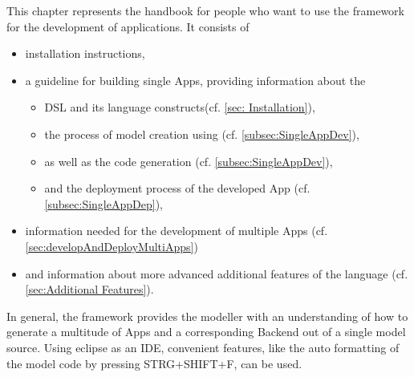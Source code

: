 

This chapter represents the handbook for people who want to use the \MD framework for the development of applications. It consists of

\begin{itemize}
	\item installation instructions,
	\item a guideline for building single Apps, providing information about the
	\begin{itemize}
		\item DSL and its language constructs(cf. \ref{sec: Installation}),
		\item the process of model creation using \MD (cf. \ref{subsec:SingleAppDev}),
		\item as well as the code generation (cf. \ref{subsec:SingleAppDev}),
		\item and the deployment process of the developed App (cf. \ref{subsec:SingleAppDep}),
	\end{itemize}
	\item information needed for the development of multiple Apps (cf. \ref{sec:developAndDeployMultiApps})
	\item and information about more advanced additional features of the language (cf. \ref{sec:Additional Features}).
\end{itemize}

In general, the \MD framework provides the modeller with an understanding of how to generate a multitude of Apps and a corresponding Backend out of a single model source. Using eclipse as an IDE, convenient features, like the auto formatting of the model code by pressing STRG+SHIFT+F, can be used.
